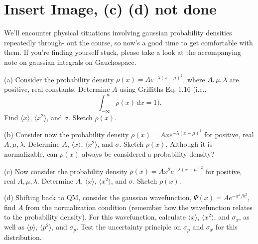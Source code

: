 \documentclass{article}
\begin{document}
\hfil

\section{Insert Image, (c) (d) not done}
\begin{ques}\label{q2}
We’ll encounter physical situations involving gaussian probability densities repeatedly through-
out the course, so now’s a good time to get comfortable with them. If you’re finding yourself
stuck, please take a look at the accompanying note on gaussian integrals on Gauchospace.

(a) Consider the probability density $\rho(x) = A e^{-\lambda(x-\mu)^2}$, where $A,\mu, \lambda$ are positive, real
constants. Determine $A$ using Griffiths Eq. 1.16 (i.e.,
\[
\int_{-\infty}^\infty \rho(x) \, dx = 1).
\]
Find $\langle x\rangle$, $\langle x^2\rangle$, and $\sigma$. Sketch $\rho(x)$.

(b) Consider now the probability density $\rho(x) = A x e^{-\lambda(x-\mu)^2}$ for positive, real $A,\mu, \lambda$.
Determine $A$, $\langle x\rangle$, $\langle x^2\rangle$, and $\sigma$. Sketch $\rho(x)$. Although it is normalizable, can $\rho(x)$
always be considered a probability density?

(c) Now consider the probability density $\rho(x) = A x^2 e^{-\lambda(x-\mu)^2}$ for positive, real $A,\mu, \lambda$.
Determine $A$, $\langle x\rangle$, $\langle x^2\rangle$, and $\sigma$. Sketch $\rho(x)$.

(d) Shifting back to QM, consider the gaussian wavefunction, $\Psi(x) = A e^{-x^2/b^2}$, find $A$
from the normalization condition (remember how the wavefunction relates to the
probability density). For this wavefunction, calculate $\langle x\rangle$, $\langle x^2\rangle$, and $\sigma_x$, as well as
$\langle p\rangle$, $\langle p^2\rangle$, and $\sigma_p$. Test the uncertainty principle on $\sigma_p$ and $\sigma_x$ for this distribution.
\end{ques}
\end{document}
